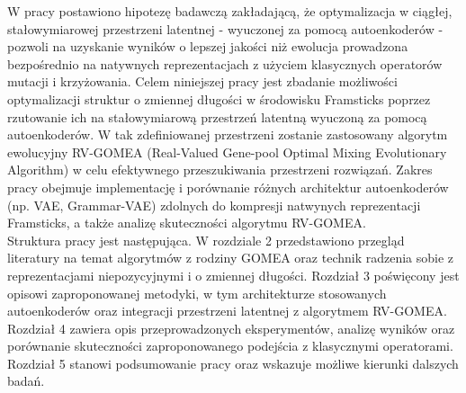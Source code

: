 W pracy postawiono hipotezę badawczą zakładającą, że optymalizacja w ciągłej, stałowymiarowej przestrzeni latentnej - wyuczonej za pomocą autoenkoderów - pozwoli na uzyskanie wyników o lepszej jakości niż ewolucja prowadzona bezpośrednio na natywnych reprezentacjach z użyciem klasycznych operatorów mutacji i krzyżowania.
\newpage
Celem niniejszej pracy jest zbadanie możliwości optymalizacji struktur o zmiennej długości w środowisku Framsticks poprzez rzutowanie ich na stałowymiarową przestrzeń latentną wyuczoną za pomocą autoenkoderów. W tak zdefiniowanej przestrzeni zostanie zastosowany algorytm ewolucyjny RV-GOMEA (Real-Valued Gene-pool Optimal Mixing Evolutionary Algorithm) w celu efektywnego przeszukiwania przestrzeni rozwiązań. Zakres pracy obejmuje implementację i porównanie różnych architektur autoenkoderów (np. VAE, Grammar-VAE) zdolnych do kompresji natwynych reprezentacji Framsticks, a także analizę skuteczności algorytmu RV-GOMEA. \\
\indent
Struktura pracy jest następująca. 
W rozdziale 2 przedstawiono przegląd literatury na temat algorytmów z rodziny GOMEA oraz technik radzenia sobie z reprezentacjami niepozycyjnymi i o zmiennej długości. 
Rozdział 3 poświęcony jest opisowi zaproponowanej metodyki, w tym architekturze stosowanych autoenkoderów oraz integracji przestrzeni latentnej z algorytmem RV-GOMEA. 
Rozdział 4 zawiera opis przeprowadzonych eksperymentów, analizę wyników oraz porównanie skuteczności zaproponowanego podejścia z klasycznymi operatorami. 
Rozdział 5 stanowi podsumowanie pracy oraz wskazuje możliwe kierunki dalszych badań.
